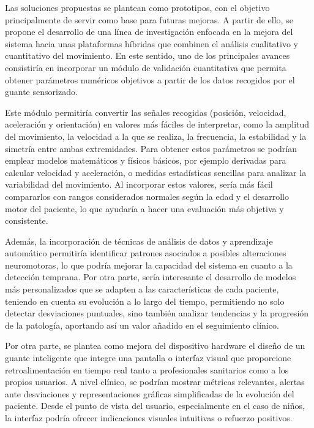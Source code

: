 
\vspace{-10px}
Las soluciones propuestas se plantean como prototipos, con el objetivo principalmente de servir como base para futuras mejoras. A partir de ello, se propone el desarrollo de una línea de investigación enfocada en la mejora del sistema hacia unas plataformas híbridas que combinen el análisis cualitativo y cuantitativo del movimiento. En este sentido, uno de los principales avances consistiría en incorporar un módulo de validación cuantitativa que permita obtener parámetros numéricos objetivos a partir de los datos recogidos por el guante sensorizado.

Este módulo permitiría convertir las señales recogidas (posición, velocidad, aceleración y orientación) en valores más fáciles de interpretar, como la amplitud del movimiento, la velocidad a la que se realiza, la frecuencia, la estabilidad y la simetría entre ambas extremidades. Para obtener estos parámetros se podrían emplear modelos matemáticos y físicos básicos, por ejemplo derivadas para calcular velocidad y aceleración, o medidas estadísticas sencillas para analizar la variabilidad del movimiento. Al incorporar estos valores, sería más fácil compararlos con rangos considerados normales según la edad y el desarrollo motor del paciente, lo que ayudaría a hacer una evaluación más objetiva y consistente.

Además, la incorporación de técnicas de análisis de datos y aprendizaje automático permitiría identificar patrones asociados a posibles alteraciones neuromotoras, lo que podría mejorar la capacidad del sistema en cuanto a la detección temprana. Por otra parte, sería interesante el desarrollo de modelos más personalizados que se adapten a las características de cada paciente, teniendo en cuenta su evolución a lo largo del tiempo, permitiendo no solo detectar desviaciones puntuales, sino también analizar tendencias y la progresión de la patología, aportando así un valor añadido en el seguimiento clínico.

Por otra parte, se plantea como mejora del dispositivo hardware el diseño de un guante inteligente que integre una pantalla o interfaz visual que proporcione retroalimentación en tiempo real tanto a profesionales sanitarios como a los propios usuarios. A nivel clínico, se podrían mostrar métricas relevantes, alertas ante desviaciones y representaciones gráficas simplificadas de la evolución del paciente. Desde el punto de vista del usuario, especialmente en el caso de niños, la interfaz podría ofrecer indicaciones visuales intuitivas o refuerzo positivos.

